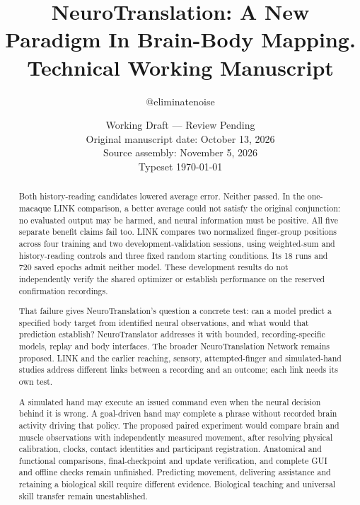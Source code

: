 \documentclass[11pt,a4paper]{article}
\begin{document}
\title{NeuroTranslation: A New Paradigm In Brain-Body Mapping.\\[.4em]\large Technical Working Manuscript}
\author{@eliminatenoise}
\date{Working Draft — Review Pending\\Original manuscript date: October 13, 2026\\Source assembly: November 5, 2026\\Typeset \today}
\maketitle

\begin{abstract}
Both history-reading candidates lowered average error. Neither passed. In the one-macaque LINK comparison, a better average could not satisfy the original conjunction: no evaluated output may be harmed, and neural information must be positive. All five separate benefit claims fail too. LINK compares two normalized finger-group positions across four training and two development-validation sessions, using weighted-sum and history-reading controls and three fixed random starting conditions. Its 18 runs and 720 saved epochs admit neither model. These development results do not independently verify the shared optimizer or establish performance on the reserved confirmation recordings.

That failure gives NeuroTranslation's question a concrete test: can a model predict a specified body target from identified neural observations, and what would that prediction establish? NeuroTranslator addresses it with bounded, recording-specific models, replay and body interfaces. The broader NeuroTranslation Network remains proposed. LINK and the earlier reaching, sensory, attempted-finger and simulated-hand studies address different links between a recording and an outcome; each link needs its own test.

A simulated hand may execute an issued command even when the neural decision behind it is wrong. A goal-driven hand may complete a phrase without recorded brain activity driving that policy. The proposed paired experiment would compare brain and muscle observations with independently measured movement, after resolving physical calibration, clocks, contact identities and participant registration. Anatomical and functional comparisons, final-checkpoint and update verification, and complete GUI and offline checks remain unfinished. Predicting movement, delivering assistance and retaining a biological skill require different evidence. Biological teaching and universal skill transfer remain unestablished.
\end{abstract}
\end{document}
